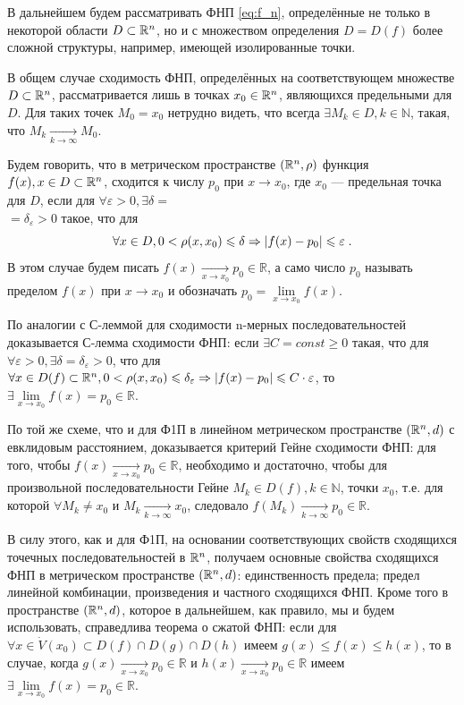 В дальнейшем будем рассматривать ФНП \eqref{eq:f_n}, определённые не только в некоторой области $D \subset \mathbb{R}^n$, но и с множеством определения $D = D(f)$ более сложной структуры, например, имеющей изолированные точки.

В общем случае сходимость ФНП, определённых на соответствующем множестве $D \subset \mathbb{R}^n$, рассматривается лишь в точках $x_0 \in \mathbb{R}^n$, являющихся предельными для $D$. Для таких точек $M_0 = x_0$ нетрудно видеть, что всегда $\exists M_k \in D, k \in \mathbb{N}$, такая, что $M_k \xrightarrow[k \to \infty]{} M_0$.

Будем говорить, что в метрическом пространстве $(\mathbb{R}^n, \rho)$ функция $f(x), x \in D \subset \mathbb{R}^n$, сходится к числу $p_0$ при $x \to x_0$, где $x_0$ — предельная точка для $D$, если для $\forall \varepsilon > 0, \exists \delta =$ \\ $= \delta_{\varepsilon} > 0$ такое, что для
\begin{equation}
\label{eq:eps_n}
\forall x \in D, 0 < \rho(x, x_0) \leqslant \delta \Rightarrow \left\lvert f(x)-p_0 \right\rvert \leqslant \varepsilon\;.
\end{equation}
В этом случае будем писать $f(x) \xrightarrow[x \to x_0]{} p_0 \in \mathbb{R}$, а само число $p_0$ называть пределом $f(x)$ при $x \to x_0$ и обозначать $p_0 = \lim\limits_{x \to x_0} f(x)$.

По аналогии с С-леммой для сходимости n-мерных последовательностей доказывается С-лемма сходимости ФНП: если $\exists C = const \geqslant 0$ такая, что для $\forall \varepsilon > 0, \exists \delta = \delta_{\varepsilon} > 0$, что для $\forall x \in D(f) \subset \mathbb{R}^n, 0 < \rho(x, x_0) \leqslant \delta_{\varepsilon} \Rightarrow \left\lvert f(x) - p_0 \right\rvert \leqslant C \cdot \varepsilon$, то $\exists  \lim\limits_{x \to x_0} f(x) = p_0 \in \mathbb{R}$.

По той же схеме, что и для Ф1П в линейном метрическом пространстве $(\mathbb{R}^n, d)$ с евклидовым расстоянием, доказывается критерий Гейне сходимости ФНП: для того, чтобы $f(x) \xrightarrow[x \to x_0]{} p_0 \in \mathbb{R}$, необходимо и достаточно,
чтобы для произвольной последовательности Гейне $M_k \in D(f), k \in \mathbb{N}$, точки $x_0$, т.е. для которой $\forall M_k \ne x_0$ и $M_k \xrightarrow[k \to \infty]{} x_0$, следовало $f(M_k) \xrightarrow[k \to \infty]{} p_0 \in \mathbb{R}$.

В силу этого, как и для Ф1П, на основании соответствующих свойств сходящихся точечных последовательностей в $\mathbb{R}^n$, получаем основные свойства
сходящихся ФНП в метрическом пространстве $(\mathbb{R}^n, d)$: единственность предела; предел линейной комбинации, произведения и частного сходящихся ФНП. Кроме того в пространстве $(\mathbb{R}^n, d)$, которое в дальнейшем, как правило, мы и будем
использовать, справедлива теорема о сжатой ФНП: если для $\forall x \in \dot{V}(x_0) \subset D(f) \cap D(g) \cap D(h)$ имеем $g(x) \leqslant f(x)
\leqslant h(x)$, то в случае, когда $g(x) \xrightarrow[x \to x_0]{} p_0 \in \mathbb{R}$ и $h(x) \xrightarrow[x \to x_0]{} p_0 \in \mathbb{R}$ имеем
$\exists  \lim\limits_{x \to x_0} f(x) = p_0 \in \mathbb{R}$.


